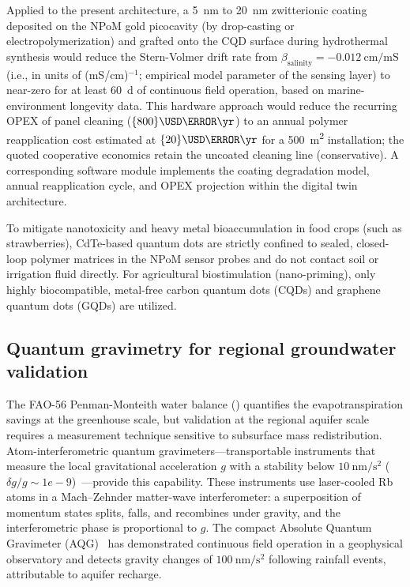 \documentclass[11pt,a4paper]{article}
\begin{document}
Applied to the present architecture, a \qty{5}{\nm} to \qty{20}{\nm} zwitterionic coating deposited on the NPoM gold picocavity (by drop-casting or electropolymerization) and grafted onto the CQD surface during hydrothermal synthesis would reduce the Stern-Volmer drift rate from $\beta_{\mathrm{salinity}} = \qty{-0.012}{\cm\per\milli\siemens}$ (i.e., in units of (mS/cm)$^{-1}$; empirical model parameter of the sensing layer) to near-zero for at least \qty{60}{\day} of continuous field operation, based on marine-environment longevity data. This hardware approach would reduce the recurring OPEX of panel cleaning ($\qty{800}{\USD\per\yr}$) to an annual polymer reapplication cost estimated at $\qty{20}{\USD\per\yr}$ for a \qty{500}{\m\squared} installation; the quoted cooperative economics retain the uncoated cleaning line (conservative). A corresponding software module implements the coating degradation model, annual reapplication cycle, and OPEX projection within the digital twin architecture.

To mitigate nanotoxicity and heavy metal bioaccumulation in food crops (such as strawberries), CdTe-based quantum dots are strictly confined to sealed, closed-loop polymer matrices in the NPoM sensor probes and do not contact soil or irrigation fluid directly. For agricultural biostimulation (nano-priming), only highly biocompatible, metal-free carbon quantum dots (CQDs) and graphene quantum dots (GQDs) are utilized.

\subsection{Quantum gravimetry for regional groundwater validation}
\label{SI-sec:gravimetry}

The FAO-56 Penman-Monteith water balance () quantifies the evapotranspiration savings at the greenhouse scale, but validation at the regional aquifer scale requires a measurement technique sensitive to subsurface mass redistribution. Atom-interferometric quantum gravimeters---transportable instruments that measure the local gravitational acceleration $g$ with a stability below $\qty{10}{\nm\per\s\squared}$ ($\delta g/g \sim {1e-9}$)~\cite{Menoret2018}---provide this capability. These instruments use laser-cooled Rb atoms in a Mach--Zehnder matter-wave interferometer: a superposition of momentum states splits, falls, and recombines under gravity, and the interferometric phase is proportional to $g$. The compact Absolute Quantum Gravimeter (AQG)~\cite{Menoret2018} has demonstrated continuous field operation in a geophysical observatory and detects gravity changes of $\qty{100}{\nm\per\s\squared}$ following rainfall events, attributable to aquifer recharge.
\end{document}
